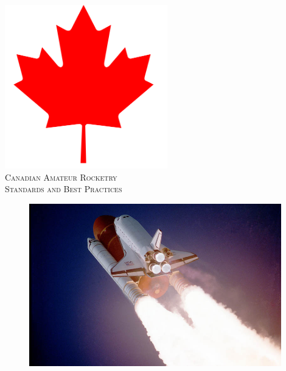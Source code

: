 
\begin{titlepage}

\newcommand{\HRule}{\rule{\linewidth}{0.5mm}} %

\center %
 

\includegraphics[width=200pt]{images/mapleleaf.png}\\[1cm] %
\textsc{\Large Canadian Amateur Rocketry}\\[0.5cm] %
\textsc{\large Standards and Best Practices}\\[0.5cm] %


\begin{figure}[ht]
    \centering
    \includegraphics[height=200pt]{images/nasa-rocket-launch-high-quality-24.jpg}\\
\end{figure}


\end{titlepage}
